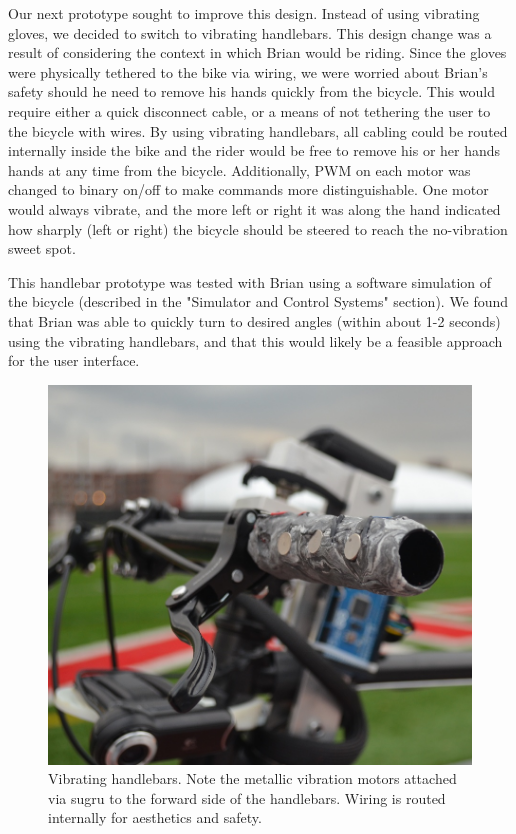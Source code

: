 \documentclass[aps,twocolumn,secnumarabic,balancelastpage,amsmath,amssymb,nofootinbib]{revtex4-1}
\begin{document}
Our next prototype sought to improve this design. Instead of using vibrating gloves, we decided to switch to vibrating handlebars. This design change was a result of considering the context in which Brian would be riding. Since the gloves were physically tethered to the bike via wiring, we were worried about Brian's safety should he need to remove his hands quickly from the bicycle. This would require either a quick disconnect cable, or a means of not tethering the user to the bicycle with wires. By using vibrating handlebars, all cabling could be routed internally inside the bike and the rider would be free to remove his or her hands hands at any time from the bicycle. Additionally, PWM on each motor was changed to binary on/off to make commands more distinguishable. One motor would always vibrate, and the more left or right it was along the hand indicated how sharply (left or right) the bicycle should be steered to reach the no-vibration sweet spot.

This handlebar prototype was tested with Brian using a software simulation of the bicycle (described in the "Simulator and Control Systems" section). We found that Brian was able to quickly turn to desired angles (within about 1-2 seconds) using the vibrating handlebars, and that this would likely be a feasible approach for the user interface.

\begin{figure}
\includegraphics[scale=0.22]{vibrating_handlebars.jpg}
\caption{Vibrating handlebars. Note the metallic vibration motors attached via sugru to the forward side of the handlebars. Wiring is routed internally for aesthetics and safety.}
\label{fig:VibratingHandlebars}
\end{figure}
\end{document}
